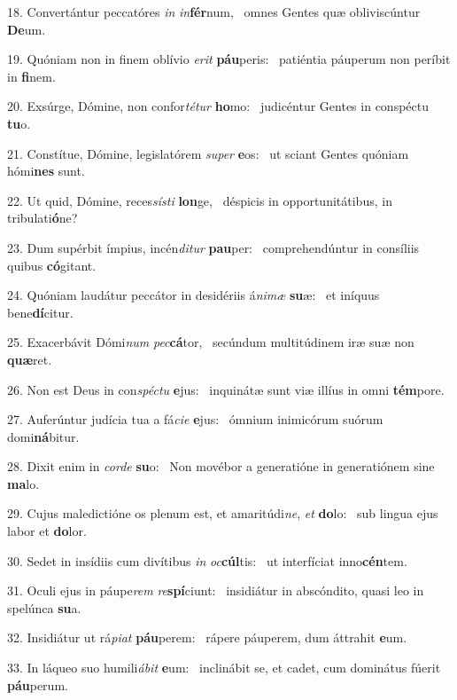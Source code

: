 18. Convertántur peccatóres \textit{in} \textit{in}\textbf{fér}num, \ast\  omnes Gentes quæ obliviscúntur \textbf{De}um.\

19. Quóniam non in finem oblívio \textit{e}\textit{rit} \textbf{páu}peris: \ast\  patiéntia páuperum non períbit in \textbf{fi}nem.\

20. Exsúrge, Dómine, non confor\textit{té}\textit{tur} \textbf{ho}mo: \ast\  judicéntur Gentes in conspéctu \textbf{tu}o.\

21. Constítue, Dómine, legislatórem \textit{su}\textit{per} \textbf{e}os: \ast\  ut sciant Gentes quóniam hómi\textbf{nes} sunt.\

22. Ut quid, Dómine, reces\textit{sís}\textit{ti} \textbf{lon}ge, \ast\  déspicis in opportunitátibus, in tribulati\textbf{ó}ne?\

23. Dum supérbit ímpius, incén\textit{di}\textit{tur} \textbf{pau}per: \ast\  comprehendúntur in consíliis quibus \textbf{có}gitant.\

24. Quóniam laudátur peccátor in desidériis á\textit{ni}\textit{mæ} \textbf{su}æ: \ast\  et iníquus bene\textbf{dí}citur.\

25. Exacerbávit Dómi\textit{num} \textit{pec}\textbf{cá}tor, \ast\  secúndum multitúdinem iræ suæ non \textbf{quæ}ret.\

26. Non est Deus in con\textit{spéc}\textit{tu} \textbf{e}jus: \ast\  inquinátæ sunt viæ illíus in omni \textbf{tém}pore.\

27. Auferúntur judícia tua a fá\textit{ci}\textit{e} \textbf{e}jus: \ast\  ómnium inimicórum suórum domi\textbf{ná}bitur.\

28. Dixit enim in \textit{cor}\textit{de} \textbf{su}o: \ast\  Non movébor a generatióne in generatiónem sine \textbf{ma}lo.\

29. Cujus maledictióne os plenum est, et amaritúdi\textit{ne}, \textit{et} \textbf{do}lo: \ast\  sub lingua ejus labor et \textbf{do}lor.\

30. Sedet in insídiis cum divítibus \textit{in} \textit{oc}\textbf{cúl}tis: \ast\  ut interfíciat inno\textbf{cén}tem.\

31. Oculi ejus in páupe\textit{rem} \textit{re}\textbf{spí}ciunt: \ast\  insidiátur in abscóndito, quasi leo in spelúnca \textbf{su}a.\

32. Insidiátur ut rá\textit{pi}\textit{at} \textbf{páu}perem: \ast\  rápere páuperem, dum áttrahit \textbf{e}um.\

33. In láqueo suo humili\textit{á}\textit{bit} \textbf{e}um: \ast\  inclinábit se, et cadet, cum dominátus fúerit \textbf{páu}perum.\

